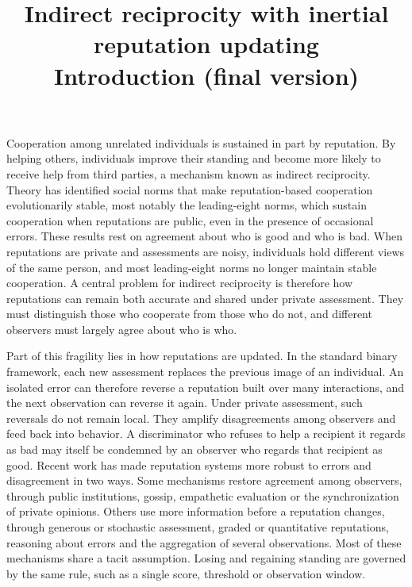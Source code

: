 \documentclass[11pt]{article}
\title{\large Indirect reciprocity with inertial reputation updating\\[0.3em]
\normalsize Introduction (final version)}
\date{}
\begin{document}
\maketitle

Cooperation among unrelated individuals is sustained in part by reputation\cite{milinski2016,nowak2005}. By helping others, individuals improve their standing and become more likely to receive help from third parties, a mechanism known as indirect reciprocity\cite{nowak1998,leimar2001,wedekind2000,milinski2002}. Theory has identified social norms that make reputation-based cooperation evolutionarily stable\cite{panchanathan2003,ohtsuki2004}, most notably the leading-eight norms, which sustain cooperation when reputations are public, even in the presence of occasional errors\cite{ohtsuki2004,ohtsuki2006}. These results rest on agreement about who is good and who is bad. When reputations are private and assessments are noisy, individuals hold different views of the same person\cite{takahashi2006,uchida2010}, and most leading-eight norms no longer maintain stable cooperation\cite{hilbe2018,okada2018,perret2021,fujimoto2023}. A central problem for indirect reciprocity is therefore how reputations can remain both accurate and shared under private assessment. They must distinguish those who cooperate from those who do not, and different observers must largely agree about who is who\cite{fujimoto2022,murase2024synchronization}.

Part of this fragility lies in how reputations are updated. In the standard binary framework, each new assessment replaces the previous image of an individual\cite{ohtsuki2004,hilbe2018}. An isolated error can therefore reverse a reputation built over many interactions, and the next observation can reverse it again. Under private assessment, such reversals do not remain local. They amplify disagreements among observers and feed back into behavior. A discriminator who refuses to help a recipient it regards as bad may itself be condemned by an observer who regards that recipient as good\cite{hilbe2018,radzvilavicius2019,okada2020}. Recent work has made reputation systems more robust to errors and disagreement in two ways. Some mechanisms restore agreement among observers, through public institutions\cite{radzvilavicius2021}, gossip\cite{kawakatsu2024}, empathetic evaluation\cite{radzvilavicius2019} or the synchronization of private opinions\cite{murase2024synchronization,tham2026,okada2024}. Others use more information before a reputation changes, through generous or stochastic assessment\cite{schmid2021,murase2023}, graded or quantitative reputations\cite{tanabe2013,murase2022,schmid2023,clark2020}, reasoning about errors\cite{pandula2024,morsky2024} and the aggregation of several observations\cite{michelmata2024}. Most of these mechanisms share a tacit assumption. Losing and regaining standing are governed by the same rule, such as a single score, threshold or observation window\cite{schmid2023,michelmata2024,yamamoto2025}.
\end{document}
